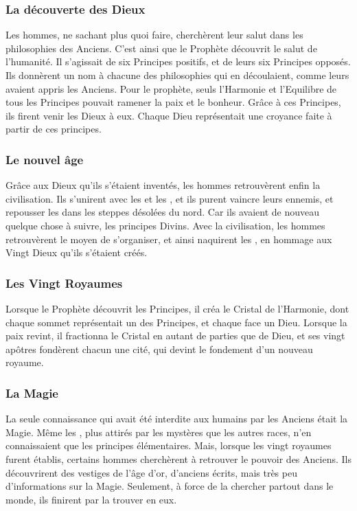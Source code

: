 \documentclass[a4paper,10pt,openany]{book}
\begin{document}
\begin{multicols}{2}
\subsubsection{La découverte des Dieux}
Les hommes, ne sachant plus quoi faire, cherchèrent leur salut dans les philosophies des Anciens. C’est ainsi que le Prophète découvrit le salut de
l’humanité. Il s’agissait de six Principes positifs, et de leurs six Principes opposés. Ils donnèrent un nom à chacune des philosophies qui en
découlaient, comme leurs avaient appris les Anciens. Pour le prophète, seuls l’Harmonie et l’Equilibre de tous les Principes pouvait ramener la paix
et le bonheur. Grâce à ces Principes, ils firent venir les Dieux à eux. Chaque Dieu représentait une croyance faite à partir de ces principes.

\subsubsection{Le nouvel âge}
Grâce aux Dieux qu’ils s’étaient inventés, les hommes retrouvèrent enfin la civilisation. Ils s’unirent avec les \Elfes et les \Nains, et ils purent
vaincre leurs ennemis, et repousser les \DemiOrcs dans les steppes désolées du nord. Car ils avaient de nouveau quelque chose à suivre, les principes
Divins. Avec la civilisation, les hommes retrouvèrent le moyen de s’organiser, et ainsi naquirent les \Royaumes, en hommage aux Vingt Dieux qu’ils
s’étaient créés.

\subsubsection{Les Vingt Royaumes}
Lorsque le Prophète découvrit les Principes, il créa le Cristal de l’Harmonie, dont chaque sommet représentait un des Principes, et chaque face un
Dieu. Lorsque la paix revint, il fractionna le Cristal en autant de parties que de Dieu, et ses vingt apôtres fondèrent chacun une cité, qui devint le
fondement d’un nouveau royaume.

\subsubsection{La Magie}
La seule connaissance qui avait été interdite aux humains par les Anciens était la Magie. Même les \Elfes, plus attirés par les mystères que les
autres races, n’en connaissaient que les principes élémentaires. Mais, lorsque les vingt royaumes furent établis, certains hommes cherchèrent à
retrouver le pouvoir des Anciens. Ils découvrirent des vestiges de l’âge d’or, d’anciens écrits, mais très peu d’informations sur la Magie. Seulement,
à force de la chercher partout dans le monde, ils finirent par la trouver en eux.



\end{multicols}
\end{document}
